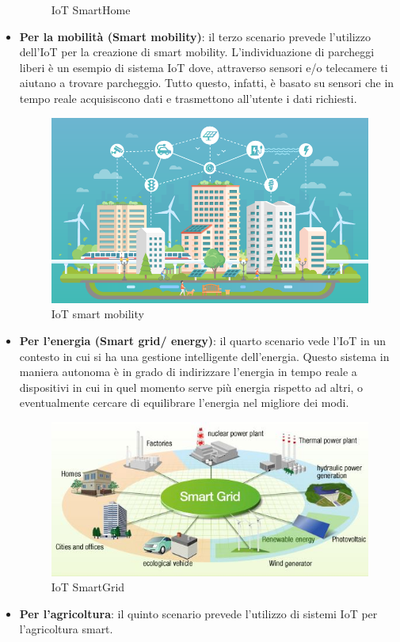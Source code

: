 \documentclass[10pt,a4paper,oneside]{scrbook}
\begin{document}
\begin{itemize}
\begin{figure}[h]
            \caption{IoT SmartHome}
            \label{fig:IoT-products-for-home}
        \end{figure}
        \item \textbf{Per la mobilità (Smart mobility)}: il terzo scenario prevede l'utilizzo dell'IoT per la creazione di smart mobility.
        L'individuazione di parcheggi liberi è un esempio di sistema IoT dove, attraverso sensori e/o telecamere ti aiutano a trovare parcheggio.
        Tutto questo, infatti, è basato su sensori che in tempo reale acquisiscono dati e trasmettono all'utente i dati richiesti. 
        \begin{figure}[h]
            \centering
            \includegraphics[width=0.6\linewidth]{img/smartcity.png}
            \caption{IoT smart mobility}
            \label{fig:-IoT-products-for-smart-mobility}
        \end{figure}
        \item \textbf{Per l'energia (Smart grid/ energy)}: il quarto scenario vede l'IoT in un contesto in cui si ha una gestione intelligente dell'energia.
        Questo sistema in maniera autonoma è in grado di indirizzare l'energia in tempo reale a dispositivi in cui in 
        quel momento serve più energia rispetto ad altri, o eventualmente cercare di equilibrare l'energia nel migliore dei modi.
        \begin{figure}[h]
            \centering
            \includegraphics[width=0.6\linewidth]{img/smart_grid.jpg}
            \caption{IoT SmartGrid}
            \label{fig:IoT-products-for-smart-grid}
        \end{figure}
        \item \textbf{Per l'agricoltura}: il quinto scenario prevede l'utilizzo di sistemi IoT per l'agricoltura smart.

\end{itemize}
\end{document}
